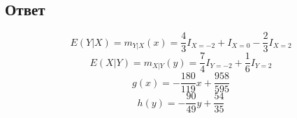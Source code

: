 \documentclass[fleqn, 10pt]{article}
\begin{document}
\subsection{Ответ}
\[E(Y|X) = m_{Y|X}(x) =  \frac{4}{3}I_{X=-2}+I_{X=0}-\frac{2}{3}I_{X=2}\]
\[E(X|Y) = m_{X|Y}(y) =  \frac{7}{4}I_{Y=-2}+\frac{1}{6}I_{Y=2}\]
\[g(x) = -\frac{180}{119}x+\frac{958}{595}\]
\[h(y) = -\frac{90}{49}y + \frac{54}{35}\]
\end{document}
